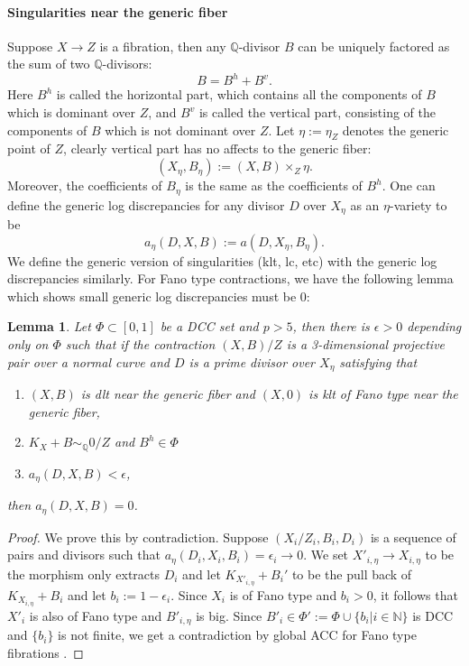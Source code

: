 \documentclass[letterpaper,reqno,12pt]{amsart}
\newcommand{\tbf}{\textbf}
\numberwithin{equation}{section}
\theoremstyle{plain}
\newtheorem{lemma}[theorem]{Lemma}
\begin{document}
\paragraph{\tbf{Singularities near the generic fiber}}
Suppose $X\to Z$ is a fibration, then any $\mathbb Q$-divisor $B$ can be uniquely factored as the sum of two $\mathbb Q$-divisors:
\[B=B^h+B^v.\]
Here $B^h$ is called the horizontal part, which contains all the components of $B$ which is dominant over $Z$, and $B^v$ is called the vertical part, consisting of the components of $B$ which is not dominant over $Z$. Let $\eta:=\eta_Z$ denotes the generic point of $Z$, clearly vertical part has no affects to the generic fiber:
\[(X_\eta,B_\eta):=(X,B)\times_Z\eta.\]
Moreover, the coefficients of $B_\eta$ is the same as the coefficients of $B^h$. One can define the generic log discrepancies for any divisor $D$ over $X_\eta$ as an $\eta$-variety to be
\[a_\eta(D,X,B):=a(D,X_\eta,B_\eta).\]
We define the generic version of singularities (klt, lc, etc) with the generic log discrepancies similarly. For Fano type contractions, we have the following lemma which shows small generic log discrepancies must be $0$:
\begin{lemma}
\label{singgen}
    Let $\Phi\subset [0,1]$ be a DCC set and $p>5$, then there is $\epsilon>0$ depending only on $\Phi$ such that if the contraction $(X,B)/Z$ is a 3-dimensional projective pair over a normal curve and $D$ is a prime divisor over $X_\eta$ satisfying that
    \begin{enumerate}
        \item $(X,B)$ is dlt near the generic fiber and $(X,0)$ is klt of Fano type near the generic fiber,
        \item $K_X+B\sim_{\mathbb Q}0/Z$ and $B^h\in\Phi$
        \item $a_\eta(D,X,B)<\epsilon$,
    \end{enumerate}
    then $a_\eta(D,X,B)=0$.
\end{lemma}
\begin{proof}
    We prove this by contradiction. Suppose $(X_i/Z_i,B_i,D_i)$ is a sequence of pairs and divisors such that $a_\eta(D_i,X_i,B_i)=\epsilon_i\to 0$. We set $X'_{i,\eta}\to X_{i,\eta}$ to be the morphism only extracts $D_i$ and let $K_{X'_{i,\eta}}+B_i'$ to be the pull back of $K_{X_{i,\eta}}+B_{i}$ and let $b_i:=1-\epsilon_i$. Since $X_i$ is of Fano type and $b_i>0$, it follows that $X'_i$ is also of Fano type and $B'_{i,\eta}$ is big. Since $B'_i\in\Phi':=\Phi\cup\{b_i|i\in\mathbb N\}$ is DCC and $\{b_i\}$ is not finite, we get a contradiction by global ACC for Fano type fibrations \cite[5.1]{waldron3mfsimperf}.
\end{proof}
\end{document}
